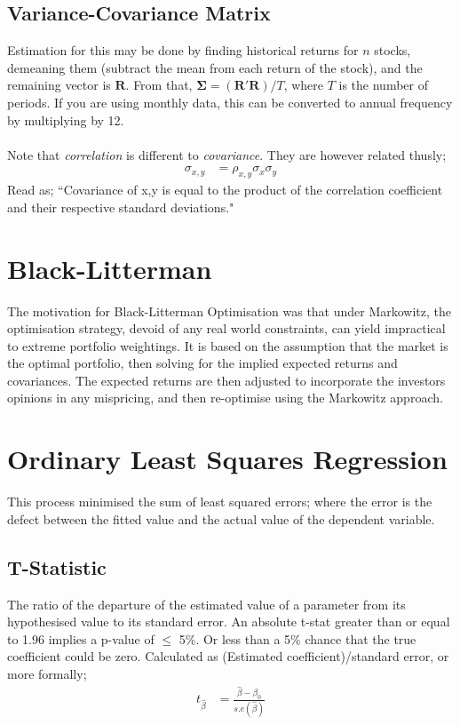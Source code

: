 \documentclass[a4paper]{article}
\begin{document}
\subsection{Variance-Covariance Matrix}
Estimation for this may be done by finding historical returns for $n$ stocks,
demeaning them
(subtract the mean from each return of the stock), and the remaining vector
is $\mathbf{R}$. From that, $\mathbf{\Sigma} = (\mathbf{R'R})/T$, where $T$
is the number of periods. If you are using monthly data, this can be converted
to annual frequency by multiplying by 12.\\\\
%
Note that \emph{correlation} is different to \emph{covariance}. They are however
related thusly;
\begin{align*}
\sigma_{x,y} &= \rho_{x,y} \sigma_x \sigma_y
\end{align*}
Read as; ``Covariance of x,y is equal to the product of the correlation
coefficient and their respective standard deviations."

\section{Black-Litterman}
The motivation for Black-Litterman Optimisation was that under Markowitz,
the optimisation strategy, devoid of any real world constraints, can yield
impractical to extreme portfolio weightings. It is
based on the assumption that the market is the optimal portfolio, then solving
for the implied expected returns and covariances. The expected returns
are then adjusted to incorporate the investors opinions in any mispricing,
and then re-optimise using the Markowitz approach.

\section{Ordinary Least Squares Regression}
This process minimised the sum of least squared errors; where the error is
the defect between the fitted value and the actual value of the dependent
variable.

\subsection{T-Statistic}
The ratio of the departure of the estimated value of a parameter from its
hypothesised value to its standard error. An absolute t-stat greater
than or equal to 1.96 implies a p-value of $\leq$ 5\%. Or less than a 5\% chance
that the true coefficient could be zero.
Calculated as
(Estimated coefficient)/standard error, or more formally;
\begin{align*}
t_{\hat{\beta}} &= \frac{\hat{\beta} - \beta_0}{s.e(\hat{\beta})}
\end{align*}
\end{document}
